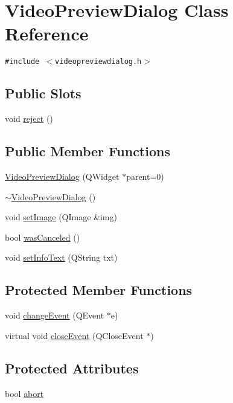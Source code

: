 \hypertarget{class_video_preview_dialog}{
\section{VideoPreviewDialog Class Reference}
\label{class_video_preview_dialog}
}
{\tt \#include $<$videopreviewdialog.h$>$}

\subsection*{Public Slots}
\begin{CompactItemize}
\item 
void \hyperlink{class_video_preview_dialog_050685f1b0dd64ec1bf2610ef45cc155}{reject} ()
\end{CompactItemize}
\subsection*{Public Member Functions}
\begin{CompactItemize}
\item 
\hyperlink{class_video_preview_dialog_c63fa85167ab97c5e2b8be1963b37f74}{VideoPreviewDialog} (QWidget $\ast$parent=0)
\item 
\hyperlink{class_video_preview_dialog_36bbfbd9fdea4eb51908052b177e5cf1}{$\sim$VideoPreviewDialog} ()
\item 
void \hyperlink{class_video_preview_dialog_7ea306a6fbef6a605138127be4093e1d}{setImage} (QImage \&img)
\item 
bool \hyperlink{class_video_preview_dialog_74c26188fe035f144c3829780bd5c86a}{wasCanceled} ()
\item 
void \hyperlink{class_video_preview_dialog_caa7fff39bf4181a031686146c51047e}{setInfoText} (QString txt)
\end{CompactItemize}
\subsection*{Protected Member Functions}
\begin{CompactItemize}
\item 
void \hyperlink{class_video_preview_dialog_f5a90a8ebc974bb4434d5ccdc98dae06}{changeEvent} (QEvent $\ast$e)
\item 
virtual void \hyperlink{class_video_preview_dialog_e80cfa06c5c8d11376dba65ac919cbd3}{closeEvent} (QCloseEvent $\ast$)
\end{CompactItemize}
\subsection*{Protected Attributes}
\begin{CompactItemize}
\item 
bool \hyperlink{class_video_preview_dialog_f1ef650168f8fcefbebd0b0f78ceb122}{abort}
\end{CompactItemize}
